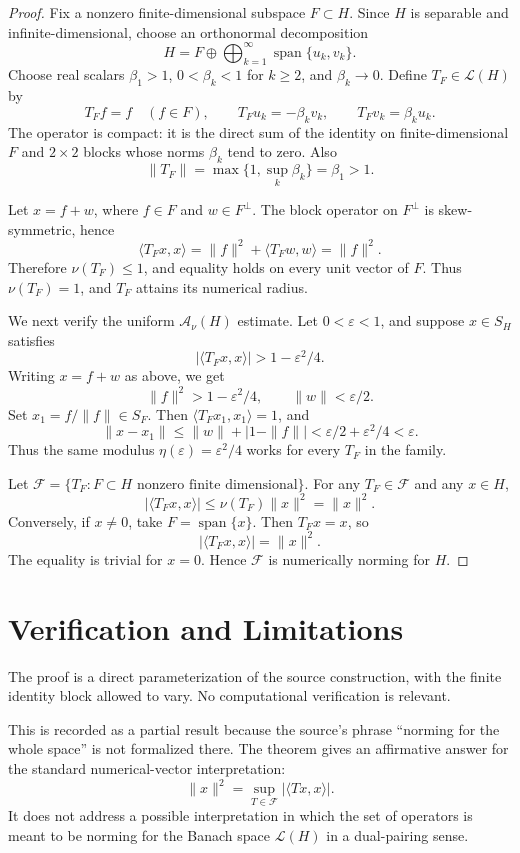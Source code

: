 \documentclass[11pt]{article}
\newcommand{\Anu}{\mathcal A_{\nu}}
\newcommand{\Lcal}{\mathcal L}
\begin{document}
\begin{proof}
Fix a nonzero finite-dimensional subspace \(F\subset H\). Since \(H\) is separable and infinite-dimensional, choose an orthonormal decomposition
\[
H=F\oplus \bigoplus_{k=1}^{\infty} \operatorname{span}\{u_k,v_k\}.
\]
Choose real scalars \(\beta_1>1\), \(0<\beta_k<1\) for \(k\ge2\), and \(\beta_k\to0\). Define \(T_F\in\Lcal(H)\) by
\[
T_F f=f\quad(f\in F),\qquad
T_Fu_k=-\beta_k v_k,\qquad
T_Fv_k=\beta_k u_k .
\]
The operator is compact: it is the direct sum of the identity on finite-dimensional \(F\) and \(2\times2\) blocks whose norms \(\beta_k\) tend to zero. Also
\[
\|T_F\|=\max\{1,\sup_k\beta_k\}=\beta_1>1.
\]

Let \(x=f+w\), where \(f\in F\) and \(w\in F^\perp\). The block operator on \(F^\perp\) is skew-symmetric, hence
\[
\langle T_Fx,x\rangle=\|f\|^2+\langle T_Fw,w\rangle=\|f\|^2.
\]
Therefore \(\nu(T_F)\le1\), and equality holds on every unit vector of \(F\). Thus \(\nu(T_F)=1\), and \(T_F\) attains its numerical radius.

We next verify the uniform \(\Anu(H)\) estimate. Let \(0<\varepsilon<1\), and suppose \(x\in S_H\) satisfies
\[
|\langle T_Fx,x\rangle|>1-\varepsilon^2/4.
\]
Writing \(x=f+w\) as above, we get
\[
\|f\|^2>1-\varepsilon^2/4,\qquad \|w\|<\varepsilon/2.
\]
Set \(x_1=f/\|f\|\in S_F\). Then \(\langle T_Fx_1,x_1\rangle=1\), and
\[
\|x-x_1\|\le \|w\|+\left|1-\|f\|\right|
<\varepsilon/2+\varepsilon^2/4<\varepsilon .
\]
Thus the same modulus \(\eta(\varepsilon)=\varepsilon^2/4\) works for every \(T_F\) in the family.

Let \(\mathscr F=\{T_F:F\subset H\text{ nonzero finite dimensional}\}\). For any \(T_F\in\mathscr F\) and any \(x\in H\),
\[
|\langle T_Fx,x\rangle|\le \nu(T_F)\|x\|^2=\|x\|^2.
\]
Conversely, if \(x\neq0\), take \(F=\operatorname{span}\{x\}\). Then \(T_Fx=x\), so
\[
|\langle T_Fx,x\rangle|=\|x\|^2.
\]
The equality is trivial for \(x=0\). Hence \(\mathscr F\) is numerically norming for \(H\).
\end{proof}

\section*{Verification and Limitations}

The proof is a direct parameterization of the source construction, with the finite identity block allowed to vary. No computational verification is relevant.

This is recorded as a partial result because the source's phrase ``norming for the whole space'' is not formalized there. The theorem gives an affirmative answer for the standard numerical-vector interpretation:
\[
\|x\|^2=\sup_{T\in\mathscr F}|\langle Tx,x\rangle|.
\]
It does not address a possible interpretation in which the set of operators is meant to be norming for the Banach space \(\Lcal(H)\) in a dual-pairing sense.
\end{document}
